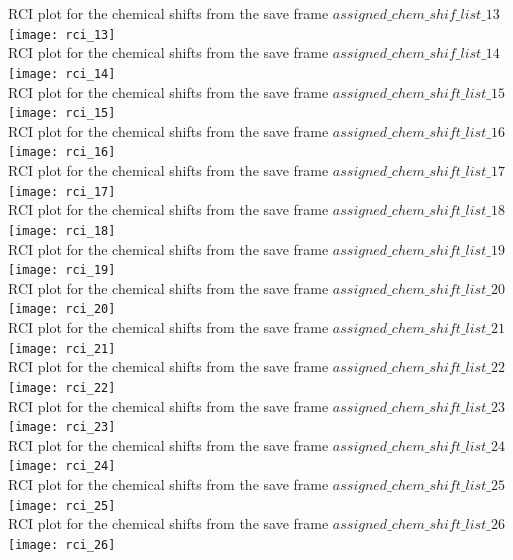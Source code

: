 RCI plot for the chemical shifts from the  save frame $assigned\_chem\_shif\_list\_13$\\ \texttt{[image: rci\_13]}\\
RCI plot for the chemical shifts from the  save frame $assigned\_chem\_shif\_list\_14$\\ \texttt{[image: rci\_14]}\\
RCI plot for the chemical shifts from the  save frame $assigned\_chem\_shift\_list\_15$\\ \texttt{[image: rci\_15]}\\
RCI plot for the chemical shifts from the  save frame $assigned\_chem\_shift\_list\_16$\\ \texttt{[image: rci\_16]}\\
RCI plot for the chemical shifts from the  save frame $assigned\_chem\_shift\_list\_17$\\ \texttt{[image: rci\_17]}\\
RCI plot for the chemical shifts from the  save frame $assigned\_chem\_shift\_list\_18$\\ \texttt{[image: rci\_18]}\\
RCI plot for the chemical shifts from the  save frame $assigned\_chem\_shift\_list\_19$\\ \texttt{[image: rci\_19]}\\
RCI plot for the chemical shifts from the  save frame $assigned\_chem\_shift\_list\_20$\\ \texttt{[image: rci\_20]}\\
RCI plot for the chemical shifts from the  save frame $assigned\_chem\_shift\_list\_21$\\ \texttt{[image: rci\_21]}\\
RCI plot for the chemical shifts from the  save frame $assigned\_chem\_shift\_list\_22$\\ \texttt{[image: rci\_22]}\\
RCI plot for the chemical shifts from the  save frame $assigned\_chem\_shift\_list\_23$\\ \texttt{[image: rci\_23]}\\
RCI plot for the chemical shifts from the  save frame $assigned\_chem\_shift\_list\_24$\\ \texttt{[image: rci\_24]}\\
RCI plot for the chemical shifts from the  save frame $assigned\_chem\_shift\_list\_25$\\ \texttt{[image: rci\_25]}\\
RCI plot for the chemical shifts from the  save frame $assigned\_chem\_shift\_list\_26$\\ \texttt{[image: rci\_26]}\\
